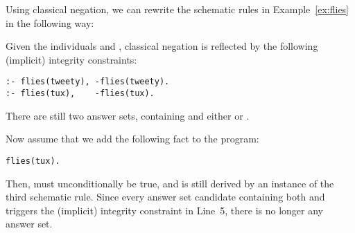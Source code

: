 \begin{example}\label{ex:flies:neg}
Using classical negation,
we can rewrite the schematic rules in Example~\ref{ex:flies}
in the following way:
%

%
Given the individuals  and ,
classical negation is reflected by
the following (implicit) integrity constraints:%
%
\begin{lstlisting}[firstnumber=4]
:- flies(tweety), -flies(tweety).
:- flies(tux),    -flies(tux).
\end{lstlisting}
There are still two answer sets,
containing  and
either  or .

Now assume that we add the following fact to the program:
\begin{lstlisting}[numbers=none]
flies(tux).
\end{lstlisting}
Then,
 must unconditionally be true,
and  is still derived by
an instance of the third schematic rule.
Since every answer set candidate containing
both  and 
triggers
the (implicit) integrity constraint in Line~5,
there is no longer any answer set.
\end{example}

